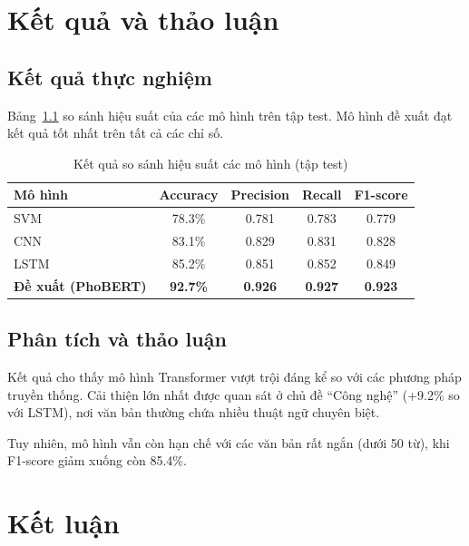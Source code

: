 \documentclass[12pt, a4paper]{report}
\begin{document}
\chapter{Kết quả và thảo luận}
\label{chap:results}

\section{Kết quả thực nghiệm}

Bảng~\ref{tab:results} so sánh hiệu suất của các mô hình trên tập test.
Mô hình đề xuất đạt kết quả tốt nhất trên tất cả các chỉ số.

\begin{table}[htbp]
  \centering
  \caption{Kết quả so sánh hiệu suất các mô hình (tập test)}
  \label{tab:results}
  \begin{tabular}{lcccc}
    \toprule
    Mô hình      & Accuracy & Precision & Recall & F1-score \\
    \midrule
    SVM          & 78.3\%   & 0.781     & 0.783  & 0.779 \\
    CNN          & 83.1\%   & 0.829     & 0.831  & 0.828 \\
    LSTM         & 85.2\%   & 0.851     & 0.852  & 0.849 \\
    \textbf{Đề xuất (PhoBERT)} & \textbf{92.7\%} & \textbf{0.926} & \textbf{0.927} & \textbf{0.923} \\
    \bottomrule
  \end{tabular}
\end{table}

\section{Phân tích và thảo luận}

Kết quả cho thấy mô hình Transformer vượt trội đáng kể so với các phương
pháp truyền thống. Cải thiện lớn nhất được quan sát ở chủ đề ``Công nghệ''
(+9.2\% so với LSTM), nơi văn bản thường chứa nhiều thuật ngữ chuyên biệt.

Tuy nhiên, mô hình vẫn còn hạn chế với các văn bản rất ngắn (dưới 50 từ),
khi F1-score giảm xuống còn 85.4\%. 

\chapter{Kết luận}
\label{chap:conclusion}
\end{document}
